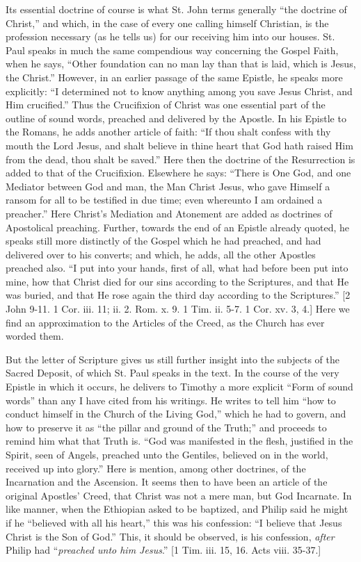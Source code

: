 Its essential doctrine of course is what St. John terms generally
``the doctrine of Christ,'' and which, in the case of every one
calling himself Christian, is the profession necessary (as he tells us)
for our receiving him into our houses. St. Paul speaks in much the same
compendious way concerning the Gospel Faith, when he says, ``Other
foundation can no man lay than that is laid, which is Jesus, the
Christ.'' However, in an earlier passage of the same Epistle, he
speaks more explicitly: ``I determined not to know anything among
you save Jesus Christ, and Him crucified.'' Thus the Crucifixion of
Christ was one essential part of the outline of sound words, preached
and delivered by the Apostle. In his Epistle to the Romans, he adds
another article of faith: ``If thou shalt confess with thy mouth the
Lord Jesus, and shalt believe in thine heart that God hath raised Him
from the dead, thou shalt be saved.'' Here then the doctrine of the
Resurrection is added to that of the Crucifixion. Elsewhere he says:
``There is One God, and one Mediator between God and man, the Man
Christ Jesus, who gave Himself a ransom for all to be testified in due
time; even whereunto I am ordained a preacher.'' Here Christ's
Mediation and Atonement are added as doctrines of Apostolical preaching.
Further, towards the end of an Epistle already quoted, he speaks still
more distinctly of the Gospel which he had preached, and had delivered
over to his converts; and which, he adds, all the other Apostles
preached also. ``I put into your hands, first of all, what had
before been put into mine, how that Christ died for our sins according
to the Scriptures, and that He was buried, and that He rose again the
third day according to the Scriptures.'' [2 John 9-11. 1 Cor. iii.
11; ii. 2. Rom. x. 9. 1 Tim. ii. 5-7. 1 Cor. xv. 3, 4.] Here we find an
approximation to the Articles of the Creed, as the Church has ever
worded them.

But the letter of Scripture gives us still further insight into the
subjects of the Sacred Deposit, of which St. Paul speaks in the text. In
the course of the very Epistle in which it occurs, he delivers to
Timothy a more explicit ``Form of sound words'' than any I have
cited from his writings. He writes to tell him ``how to conduct
himself in the Church of the Living God,'' which he had to govern,
and how to preserve it as ``the pillar and ground of the
Truth;'' and proceeds to remind him what that Truth is. ``God
was manifested in the flesh, justified in the Spirit, seen of Angels,
preached unto the Gentiles, believed on in the world, received up into
glory.'' Here is mention, among other doctrines, of the Incarnation
and the Ascension. It seems then to have been an article of the original
Apostles' Creed, that Christ was not a mere man, but God Incarnate. In
like manner, when the Ethiopian asked to be baptized, and Philip said he
might if he ``believed with all his heart,'' this was his
confession: ``I believe that Jesus Christ is the Son of God.''
This, it should be observed, is his confession, \emph{after} Philip had
``\emph{preached unto him Jesus}.'' [1 Tim. iii. 15, 16. Acts viii.
35-37.]

